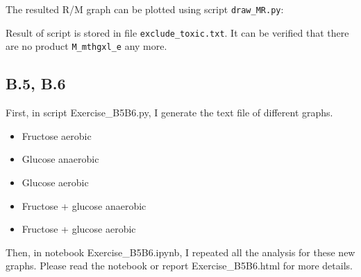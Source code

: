\documentclass[]{article}
\newenvironment{Shaded}{}{}
\newcommand{\ExtensionTok}[1]{#1}
\newcommand{\NormalTok}[1]{#1}
\begin{document}
The resulted R/M graph can be plotted using script \texttt{draw\_MR.py}:

\begin{Shaded}
\end{Shaded}

Result of script is stored in file \texttt{exclude\_toxic.txt}. It can
be verified that there are no product \texttt{M\_mthgxl\_e} any more.

\hypertarget{header-n73}{%
\subsection{B.5, B.6}\label{header-n73}}

First, in script Exercise\_B5B6.py, I generate the text file of
different graphs.

\begin{itemize}
\item
  Fructose aerobic
\item
  Glucose anaerobic
\item
  Glucose aerobic
\item
  Fructose + glucose anaerobic
\item
  Fructose + glucose aerobic
\end{itemize}

Then, in notebook Exercise\_B5B6.ipynb, I repeated all the analysis for
these new graphs. Please read the notebook or report Exercise\_B5B6.html
for more details.
\end{document}
